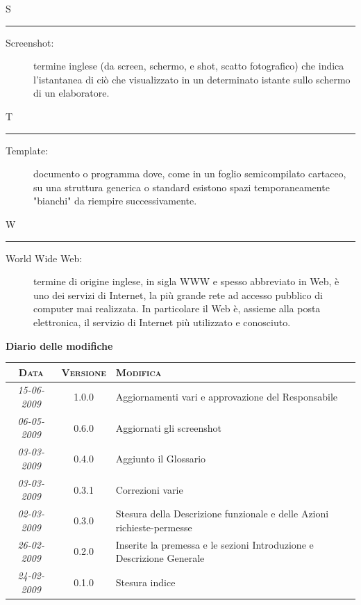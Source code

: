 \documentclass[11pt,a4paper]{article}
\newcommand{\modifiche} 
{
\newpage
\begin{center}
\textbf{Diario delle modifiche} \\
\bigskip
\begin{tabular}{|c|c|p{0.62\textwidth}|}
\hline
\textsc{Data} & \textsc{Versione} & \textsc{Modifica} \\
\hline
\hline
\textit{15-06-2009} & 1.0.0 & Aggiornamenti vari e approvazione del Responsabile\\
\hline
\textit{06-05-2009} & 0.6.0 & Aggiornati gli screenshot\\
\hline
\textit{03-03-2009} & 0.4.0 & Aggiunto il Glossario\\
\hline
\textit{03-03-2009} & 0.3.1 & Correzioni varie\\
\hline
\textit{02-03-2009} & 0.3.0 & Stesura  della Descrizione funzionale e delle Azioni richieste-permesse\\
\hline
\textit{26-02-2009} & 0.2.0 & Inserite la premessa e le sezioni Introduzione e Descrizione Generale\\
\hline
\textit{24-02-2009} & 0.1.0 & Stesura indice\\
\hline
\end{tabular}
\end{center}
}
\begin{document}
\bigskip
\Huge S \bigskip
\hrule
\smallskip
\normalsize
\begin{description}
	\item[Screenshot:] termine inglese (da screen, schermo, e shot, scatto fotografico) che indica l'istantanea di ciò che visualizzato in un determinato istante sullo schermo di un elaboratore.
\end{description}
\bigskip
\Huge T \bigskip
\hrule
\smallskip
\normalsize
\begin{description}
	\item[Template:] documento o programma dove, come in un foglio semicompilato cartaceo, su una struttura generica o standard esistono spazi temporaneamente "bianchi" da riempire successivamente.
\end{description}
\bigskip
\Huge W \bigskip
\hrule
\smallskip
\normalsize
\begin{description}
	\item[World Wide Web:] termine di origine inglese, in sigla WWW e spesso abbreviato in Web, è uno dei servizi di Internet, la più grande rete ad accesso pubblico di computer mai realizzata. In particolare il Web è, assieme alla posta elettronica, il servizio di Internet più utilizzato e conosciuto.
\end{description}
\modifiche
\end{document}
